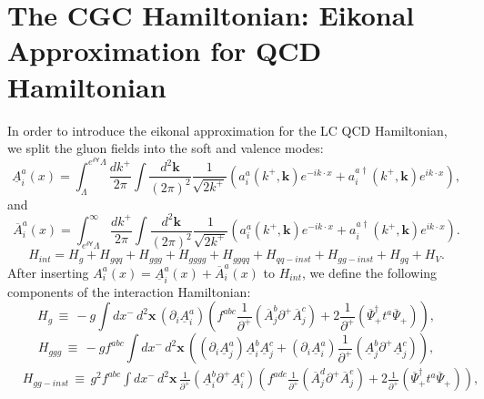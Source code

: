\documentclass[aps,prd,amsmath,amssymb,nofootinbib]{revtex4-2}
\numberwithin{equation}{section}
\begin{document}
\section{The CGC Hamiltonian: Eikonal Approximation for  QCD Hamiltonian}
In order to introduce the eikonal approximation for the LC QCD Hamiltonian, we split the gluon fields into  the soft and valence modes: 
\begin{equation}\label{Am}
\underline{A}_{i}^{a}(x)=\int_{\Lambda}^{e^{\delta\mathsf{Y}}\Lambda}\frac{dk^{+}}{2\pi}\int\frac{d^{2}\mathbf{k}}{(2\pi)^{2}}\frac{1}{\sqrt{2k^{+}}}\left(a_{i}^{a}(k^{+},\mathbf{k})e^{-ik\cdot x}+a_{i}^{a\dagger}(k^{+},\mathbf{k})e^{ik\cdot x}\right),
 \end{equation}
and
\begin{equation}\label{Ap}
\overline{A}_{i}^{a}(x)=\int_{e^{\delta\mathsf{Y}}\Lambda}^{\infty}\frac{dk^{+}}{2\pi}\int\frac{d^{2}\mathbf{k}}{(2\pi)^{2}}\frac{1}{\sqrt{2k^{+}}}\left(a_{i}^{a}(k^{+},\mathbf{k})e^{-ik\cdot x}+a_{i}^{a\dagger}(k^{+},\mathbf{k})e^{ik\cdot x}\right).
 \end{equation}
 \begin{equation}
H_{int}=H_{g}+H_{gqq}+H_{ggg}+H_{gggg}+H_{ggqq}+H_{qq-inst}+H_{gg-inst}+H_{gq}+H_{V}.
  \end{equation}
After inserting $A_{i}^{a}(x)=\underline{A}_{i}^{a}(x)+\overline{A}_{i}^{a}(x)$  to $H_{int}$, we define the following components of the interaction Hamiltonian:
 \begin{equation}\label{Hg}
H_{g}\,\equiv\,-g\int dx^{-}\, d^{2}\mathbf{x}\,(\partial_{i}\underline{A}_{i}^{a})\left(f^{abc}\frac{1}{\partial^{+}}(\overline{A}_{j}^{b}\partial^{+}\overline{A}_{j}^{c})+2\frac{1}{\partial^{+}}(\overline{\Psi}_{+}^{\dagger}t^{a}\overline{\Psi}_{+})\right),
  \end{equation}
\begin{equation}\label{hggg}
H_{ggg}\,\equiv\,-gf^{abc}\int dx^{-}\, d^{2}\mathbf{x}\,\left((\partial_{i}\underline{A}_{j}^{a})\underline{A}_{i}^{b}\underline{A}_{j}^{c}+(\partial_{i}\underline{A}_{i}^{a})\frac{1}{\partial^{+}}(\underline{A}_{j}^{b}\partial^{+}\underline{A}_{j}^{c})\right),
 \end{equation}
  \begin{equation}\begin{split}\label{ggi}
&H_{gg-inst}\,\equiv\,g^{2}f^{abc}\int dx^{-}\, d^{2}\mathbf{x}\,\frac{1}{\partial^{+}}(\underline{A}_{i}^{b}\partial^{+}\underline{A}_{i}^{c})\left(f^{ade}\frac{1}{\partial^{+}}(\overline{A}_{j}^{d}\partial^{+}\overline{A}_{j}^{e})+2\frac{1}{\partial^{+}}(\overline{\Psi}_{+}^{\dagger}t^{a}\overline{\Psi}_{+})\right),
 \end{split}\end{equation}
\end{document}
